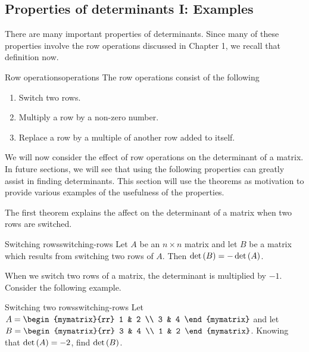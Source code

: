 \subsection{Properties of determinants I: Examples}

There are many important properties of determinants. Since many of these properties involve
the row operations discussed in Chapter 1, we recall that definition now. 

\begin{definition}{Row operations}{operations}
The row operations
consist of the following

\begin{enumerate}
\item Switch two rows.

\item Multiply a row by a non-zero number.

\item Replace a row by a multiple of another row added to itself.
\end{enumerate}
\end{definition}

We will now consider the effect of row operations on the determinant of a matrix. In future sections, we will see that using the following properties can 
greatly assist in finding determinants. This section will use the theorems as motivation to provide various examples of the usefulness of the properties. 

The first theorem explains the affect on the determinant of a matrix when two rows are switched. 

\begin{theorem}{Switching rows}{switching-rows}
Let $A$ be an $n\times n$ matrix and let $B$ be a matrix
which results from switching two rows of $A$. Then $\det \left(B\right)
= - \det \left(A\right)$. 
\end{theorem}

When we switch two rows of a matrix, the determinant is multiplied by $-1$. Consider the following example.

\begin{example}{Switching two rows}{switching-rows}
Let $A=\begin{mymatrix}{rr}
1 & 2 \\
3 & 4
\end{mymatrix} $ and let $B=\begin{mymatrix}{rr}
3 & 4 \\
1 & 2
\end{mymatrix}$. 
Knowing that $\det \left(A \right) =-2$, find $\det \left(B \right)$.
\end{example}

